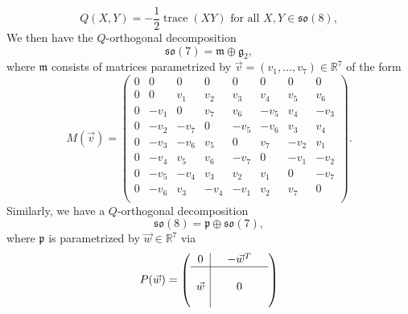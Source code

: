 \documentclass{amsart}
\numberwithin{equation}{section}
\theoremstyle{plain}
\theoremstyle{definition}
\theoremstyle{remark}
\numberwithin{table}{section}
\DeclareMathOperator{\trace}{trace}
\newcommand{\fg}{\mathfrak{g}}
\newcommand{\fm}{\mathfrak{m}}
\newcommand{\fp}{\mathfrak{p}}
\newcommand{\so}{\mathfrak{so}}
\newcommand{\bR}{\mathbb{R}}
\begin{document}
    \[
        Q(X,Y) = - \frac{1}{2} \trace(XY) \text{ for all } X,Y \in \so(8),
    \]
    We then have the $Q$-orthogonal decomposition
    \[
        \so(7) = \fm \oplus \fg_2,
    \]
    where $\fm$ consists of matrices parametrized by $\vec{v} = (v_1,\dots,v_7) \in \bR^7$ of the form
    \begin{equation}
    \label{eq:M}
        M(\vec{v}) = 
        \begin{pmatrix}
            0   & 0       & 0     & 0     & 0     & 0     & 0     & 0     \\
            0   & 0       & v_1   & v_2   & v_3   & v_4   & v_5   & v_6   \\
            0   & -v_1    & 0     & v_7   & v_6   & -v_5  & v_4   & -v_3  \\
            0   & -v_2    & -v_7  & 0     & -v_5  & -v_6  & v_3   & v_4   \\
            0   & -v_3    & -v_6  & v_5   & 0     & v_7   & -v_2  & v_1   \\
            0   & -v_4    & v_5   & v_6   & -v_7  & 0     & -v_1  & -v_2  \\
            0   & -v_5    & -v_4  & v_3   & v_2   & v_1   & 0     & -v_7  \\
            0   & -v_6    & v_3   & -v_4  & -v_1  & v_2   & v_7   & 0     \\
        \end{pmatrix}.
    \end{equation}
    Similarly, we have a $Q$-orthogonal decomposition 
    \[
        \so(8) = \fp \oplus \so(7),
    \]
    where $\fp$ is parametrized by $\vec{w} \in \bR^7$ via
    \begin{equation}
    \label{eq:P}
        P(\vec{w}) = 
        \left( 
            \begin{array}{c|ccc}
              0 &  & -\vec{w}^T &  \\ \hline
               &  &  &  \\
              \vec{w} &  & 0 &  \\
               &  &  &  
            \end{array} 
        \right)
    \end{equation}
\end{document}
